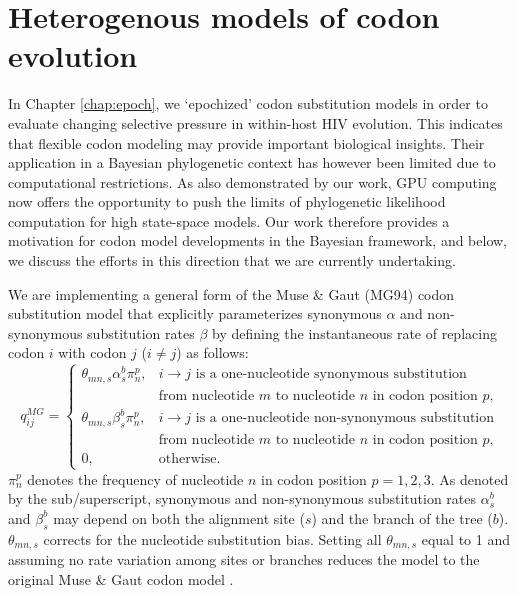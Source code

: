 \section{Heterogenous models of codon evolution\label{sub:dpp}}




In Chapter \ref{chap:epoch}, we `epochized' codon substitution models in order to evaluate changing selective pressure in within-host HIV evolution. 
This indicates that flexible codon modeling may provide important biological insights. 
Their application in a Bayesian phylogenetic context has however been limited due to computational restrictions. 
As also demonstrated by our work, GPU computing now offers the opportunity to push the limits of phylogenetic likelihood computation for high state-space models. 
Our work therefore provides a motivation for codon model developments in the Bayesian framework, and below, we discuss the efforts in this direction that we are currently undertaking.

We are implementing a general form of the Muse \& Gaut (MG94) codon substitution model \citep{muse94} that explicitly parameterizes synonymous $\alpha$ and non-synonymous substitution rates $\beta$ by defining the instantaneous rate of replacing codon $i$ with codon $j$ ($i \neq j$) as follows:
\begin{displaymath}
q_{ij}^{MG} = \begin{cases} \theta_{mn,s}\alpha_{s}^{b}\pi_{n}^{p}, & i \to j \text{ is a one-nucleotide synonymous substitution} \\ & \text{from nucleotide $m$ to nucleotide $n$ in codon position $p$,} \\ \theta_{mn,s}\beta_{s}^{b}\pi_{n}^{p}, & i \to j \text{ is a one-nucleotide non-synonymous substitution} \\ & \text{from nucleotide $m$ to nucleotide $n$ in codon position $p$,} \\ 0, & \text{otherwise.} \end{cases}
\end{displaymath}
$\pi_{n}^{p}$ denotes the frequency of nucleotide $n$ in codon position $p = 1,2,3$. As denoted by the sub/superscript, synonymous and non-synonymous substitution rates $\alpha_{s}^{b}$ and  $\beta_{s}^{b}$ may depend on both the alignment site ($s$) and  the branch of the tree ($b$).  $\theta_{mn,s}$ corrects for the nucleotide substitution bias. Setting all $\theta_{mn,s}$ equal to 1 and assuming no rate variation among sites or branches reduces the model to the original Muse \& Gaut codon model \citep{muse94}.


